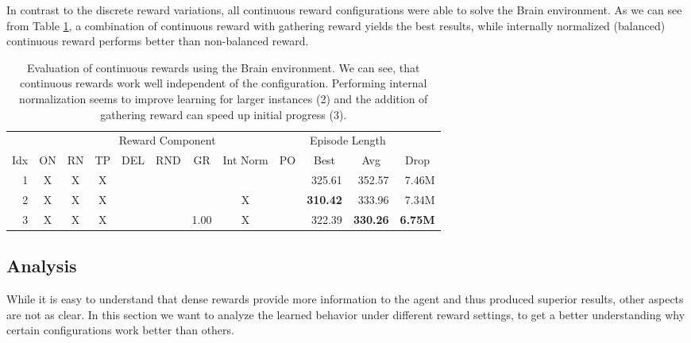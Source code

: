 In contrast to the discrete reward variations, all continuous reward configurations were able to solve the Brain environment. As we can see from Table \ref{tab:Maze0122/Reward/Continuous}, a combination of continuous reward with gathering reward yields the best results, while internally normalized (balanced) continuous reward performs better than non-balanced reward.

\begin{table}[htp]
    \begin{center}
        \begin{tabular}{rccccccccrrr}
            \toprule
             & \multicolumn{8}{c}{Reward Component} & \multicolumn{2}{c}{Episode Length} & \\
            \cmidrule(lr){2-9}\cmidrule(lr){10-11}
            \multicolumn{1}{c}{Idx} & \multicolumn{1}{c}{ON} & \multicolumn{1}{c}{RN} & \multicolumn{1}{c}{TP} & \multicolumn{1}{c}{DEL} & \multicolumn{1}{c}{RND} & \multicolumn{1}{c}{GR} & \multicolumn{1}{c}{Int Norm} & \multicolumn{1}{c}{PO} & \multicolumn{1}{c}{Best} & \multicolumn{1}{c}{Avg} & \multicolumn{1}{c}{Drop}\\
            \midrule
            1 & X & X & X &  &  &  &  &  & 325.61 & 352.57 & 7.46M \\
            2 & X & X & X &  &  &  & X &  & \textbf{310.42} & 333.96 & 7.34M \\
            3 & X & X & X &  &  & 1.00 & X &  & 322.39 & \textbf{330.26} & \textbf{6.75M} \\
            \bottomrule
        \end{tabular}
    \end{center}
    \caption[Evaluation of Continuous Rewards using the Brain Environment]{Evaluation of continuous rewards using the Brain environment. We can see, that continuous rewards work well independent of the configuration. Performing internal normalization seems to improve learning for larger instances (2) and the addition of gathering reward can speed up initial progress (3).} \label{tab:Maze0122/Reward/Continuous}
\end{table}


\subsection{Analysis} \label{sec:RewardAnalysis}
While it is easy to understand that dense rewards provide more information to the agent and thus produced superior results, other aspects are not as clear. In this section we want to analyze the learned behavior under different reward settings, to get a better understanding why certain configurations work better than others.

